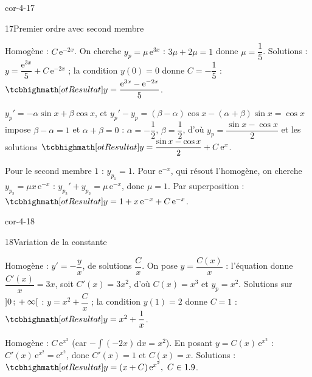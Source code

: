 \begin{blocLivre}{cor-4-17}
\begin{corrige}{17}{Premier ordre avec second membre}
\begin{questions}
  \item Homogène : $C\,\mathrm{e}^{-2x}$. On cherche $y_p=\mu\,\mathrm{e}^{3x}$ :
    $3\mu+2\mu=1$ donne $\mu=\dfrac15$. Solutions :
    $y=\dfrac{\mathrm{e}^{3x}}{5}+C\,\mathrm{e}^{-2x}$ ; la condition $y(0)=0$ donne
    $C=-\dfrac15$ :
    $\res{y=\dfrac{\mathrm{e}^{3x}-\mathrm{e}^{-2x}}{5}}$.
  \item $y_p'=-\alpha\sin x+\beta\cos x$, et
    $y_p'-y_p=(\beta-\alpha)\cos x-(\alpha+\beta)\sin x=\cos x$ impose
    $\beta-\alpha=1$ et $\alpha+\beta=0$ : $\alpha=-\dfrac12$,
    $\beta=\dfrac12$, d'où $y_p=\dfrac{\sin x-\cos x}{2}$ et les solutions
    $\res{y=\dfrac{\sin x-\cos x}{2}+C\,\mathrm{e}^{x}}$.
  \item Pour le second membre $1$ : $y_{p_1}=1$. Pour $\mathrm{e}^{-x}$, qui
    résout l'homogène, on cherche $y_{p_2}=\mu x\,\mathrm{e}^{-x}$ :
    $y_{p_2}'+y_{p_2}=\mu\,\mathrm{e}^{-x}$, donc $\mu=1$. Par superposition :
    $\res{y=1+x\,\mathrm{e}^{-x}+C\,\mathrm{e}^{-x}}$.
\end{questions}
\end{corrige}
\end{blocLivre}

\begin{blocLivre}{cor-4-18}
\begin{corrige}{18}{Variation de la constante}
\begin{questions}
  \item Homogène : $y'=-\dfrac{y}{x}$, de solutions $\dfrac{C}{x}$. On pose
    $y=\dfrac{C(x)}{x}$ : l'équation donne $\dfrac{C'(x)}{x}=3x$, soit
    $C'(x)=3x^{2}$, d'où $C(x)=x^{3}$ et $y_p=x^{2}$. Solutions sur
    $\mathopen{]}0\,{;}\,+\infty\mathclose{[}$ : $y=x^{2}+\dfrac{C}{x}$ ; la condition $y(1)=2$
    donne $C=1$ : $\res{y=x^{2}+\dfrac1x}$.
  \item Homogène : $C\,\mathrm{e}^{x^{2}}$ (car $-\!\int(-2x)\,\mathrm{d}x=x^{2}$). En posant
    $y=C(x)\,\mathrm{e}^{x^{2}}$ : $C'(x)\,\mathrm{e}^{x^{2}}=\mathrm{e}^{x^{2}}$, donc
    $C'(x)=1$ et $C(x)=x$. Solutions :
    $\res{y=(x+C)\,\mathrm{e}^{x^{2}},\ C\in\R}$.
\end{questions}
\end{corrige}
\end{blocLivre}

